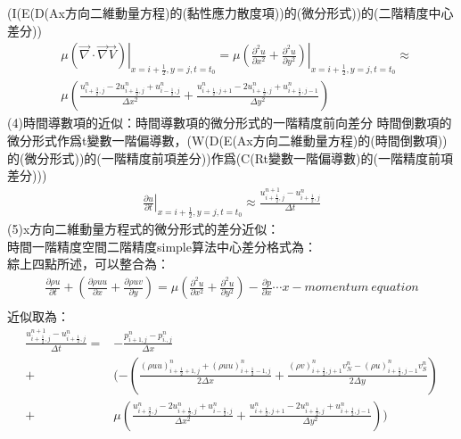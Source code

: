 \documentclass[12pt]{article}
\begin{document}
(I(E(D(Ax方向二維動量方程)的(黏性應力散度項))的(微分形式))的(二階精度中心差分))
\begin{equation}\begin{split}
    &\left.\mu\left(\vec{\nabla}\cdot \vec{\nabla}\vec{V}\right)\right|_{x = i+\frac{1}{2},y=j , t = t_0} = \mu\left.\left(\frac{\partial^2 u}{\partial x^2} + \frac{\partial^2 u}{\partial y^2}\right)\right|_{x = i + \frac{1}{2},y = j , t = t_0} \approx \\[1.5ex]
    &\mu\left(\frac{u_{i+\frac{3}{2},j}^{n}-2u_{i+\frac{1}{2},j}^{n}+u_{i-\frac{1}{2},j}^{n}}{\Delta x^{2}} + \frac{u_{i+\frac{1}{2},j+1}^{n}-2u_{i+\frac{1}{2},j}^{n}+u_{i+\frac{1}{2},j-1}^{n}}{\Delta y^{2}}\right)
\end{split}\end{equation}
\noindent  (4)時間導數項的近似：時間導數項的微分形式的一階精度前向差分
時間倒數項的微分形式作爲t變數一階偏導數，(W(D(E(Ax方向二維動量方程)的(時間倒數項))的(微分形式))的(一階精度前項差分))作爲(C(Rt變數一階偏導數)的(一階精度前項差分)))\\[1.5ex]
\begin{equation}\begin{split}
    \left.\frac{\partial u}{\partial t}\right|_{x = i+\frac{1}{2},y = j , t = t_0} \approx \frac{u_{i+\frac{1}{2},j}^{n+1} - u_{i+\frac{1}{2},j}^{n}}{\Delta t}
\end{split}\end{equation}
\noindent (5)x方向二維動量方程式的微分形式的差分近似：\\
時間一階精度空間二階精度simple算法中心差分格式為：\\
\noindent 綜上四點所述，可以整合為：\\
\begin{equation}\begin{split}
    \frac{\partial \rho u}{\partial t} + (\frac{\partial \rho u u}{\partial x} + \frac{\partial \rho uv}{\partial y}) = \mu(\frac{\partial^2 u}{\partial x^2} + \frac{\partial^2 u}{\partial y^2}) -\frac{\partial p}{\partial x} \cdots x-momentum\ equation\\[1.5ex]
\end{split}\end{equation}
\noindent 近似取為：\\
\begin{equation}\begin{split}
      \frac{u_{i+\frac{1}{2},j}^{n+1} - u_{i+\frac{1}{2},j}^{n}}{\Delta t} =& - \frac{p_{i+1,j}^{n} - p_{i.,j}^{n}}{\Delta x} \\[1.5ex]
      +&(-\left(\frac{(\rho u u)_{i+\frac{1}{2}+1,j}^{n} + (\rho u u)_{i+\frac{1}{2}-1,j}^{n}}{2\Delta x} + \frac{(\rho v)_{i+\frac{1}{2},j+1}^{n}v_{N}^{n} - (\rho u )_{i+\frac{1}{2},j-1}^{n}v_{S}^{n}}{2\Delta y}\right)\\[1.5ex]
      +&\mu\left(\frac{u_{i+\frac{3}{2},j}^{n}-2u_{i+\frac{1}{2},j}^{n}+u_{i-\frac{1}{2},j}^{n}}{\Delta x^{2}} + \frac{u_{i+\frac{1}{2},j+1}^{n}-2u_{i+\frac{1}{2},j}^{n}+u_{i+\frac{1}{2},j-1}^{n}}{\Delta y^{2}}\right))\\[1.5ex]
\end{split}\end{equation}
\end{document}

